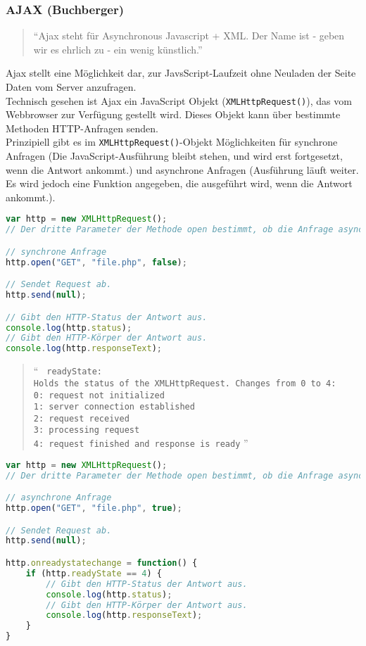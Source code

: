 \subsubsection{AJAX (Buchberger)} 
\label{sec:content_js_AJAX}
\begin{quote}
\enquote{Ajax steht für Asynchronous Javascript + XML. Der Name ist - geben wir es ehrlich zu - ein wenig künstlich.} \cite[S. 317]{ajax}
\end{quote}
Ajax stellt eine Möglichkeit dar, zur JavsScript-Laufzeit ohne Neuladen der Seite Daten vom Server anzufragen.\\
Technisch gesehen ist Ajax ein JavaScript Objekt (\texttt{XMLHttpRequest()}), das vom Webbrowser zur Verfügung gestellt wird. Dieses Objekt kann über bestimmte Methoden HTTP-Anfragen senden.\\
Prinzipiell gibt es im \texttt{XMLHttpRequest()}-Objekt Möglichkeiten für synchrone Anfragen (Die JavaScript-Ausführung bleibt stehen, und wird erst fortgesetzt, wenn die Antwort ankommt.) und asynchrone Anfragen (Ausführung läuft weiter. Es wird jedoch eine Funktion angegeben, die ausgeführt wird, wenn die Antwort ankommt.).\\
\begin{lstlisting}[style=custom, language=JavaScript,  caption={Synchrones AJAX},label={lst:content_ajax_0}]
var http = new XMLHttpRequest();
// Der dritte Parameter der Methode open bestimmt, ob die Anfrage asynchron sein soll.

// synchrone Anfrage
http.open("GET", "file.php", false);

// Sendet Request ab.
http.send(null);

// Gibt den HTTP-Status der Antwort aus.
console.log(http.status);
// Gibt den HTTP-Körper der Antwort aus.
console.log(http.responseText);
\end{lstlisting}
\begin{quote}
\enquote{
\texttt{
readyState:\\
Holds the status of the XMLHttpRequest. Changes from 0 to 4:\\
0: request not initialized\\
1: server connection established\\
2: request received\\
3: processing request\\ 
4: request finished and response is ready} \cite{readyState}
}
\end{quote}
\begin{lstlisting}[style=custom, language=JavaScript,  caption={Asynchrones AJAX},label={lst:content_ajax_1}]
var http = new XMLHttpRequest();
// Der dritte Parameter der Methode open bestimmt, ob die Anfrage asynchron sein soll.

// asynchrone Anfrage
http.open("GET", "file.php", true);

// Sendet Request ab.
http.send(null);

http.onreadystatechange = function() {
	if (http.readyState == 4) {
		// Gibt den HTTP-Status der Antwort aus.
		console.log(http.status);
		// Gibt den HTTP-Körper der Antwort aus.
		console.log(http.responseText);
	}
}
\end{lstlisting}
